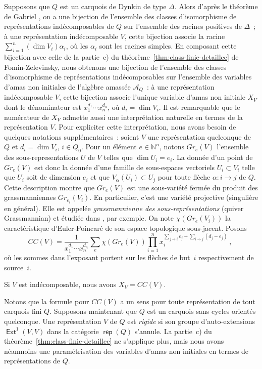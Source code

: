 \documentclass[brochure,12pt]{bourbaki}
\newcommand{\ko}{\: , \;}
\numberwithin{equation}{subsection}
\numberwithin{theorem}{section}
\newcommand{\opname}[1]{\operatorname{\mathsf{#1}}}
\newcommand{\rep}{\opname{rep}\nolimits}
\renewcommand{\rep}{\opname{rep}\nolimits}
\newcommand{\N}{\mathbb{N}}
\newcommand{\Ext}{\opname{Ext}}
\newcommand{\ca}{{\mathcal A}}
\begin{document}
Supposons que $Q$ est un carquois de Dynkin de type $\Delta$. Alors d'apr\`es le
th\'eor\`eme de Gabriel \cite{Gabriel73}, on a une bijection de
l'ensemble des classes d'isomorphisme de repr\'esentations
ind\'ecomposables de $Q$ sur l'ensemble des racines
positives de $\Delta$~; \`a une repr\'esentation ind\'ecomposable
$V$, cette bijection associe la racine
$
\sum_{i=1}^n (\dim V_i) \alpha_i
$,
o\`u les $\alpha_i$ sont les racines simples. En composant cette bijection
avec celle de la partie~c) du th\'eor\`eme~\ref{thm:class-finie-detaillee}
de Fomin-Zelevinsky,
nous obtenons une bijection de l'ensemble des classes
d'isomorphisme de repr\'esentations ind\'ecomposables sur l'ensemble
des variables d'amas non initiales de l'alg\`ebre amass\'ee $\ca_Q$~:
\`a une repr\'esentation ind\'ecomposable $V$, cette bijection associe l'unique
variable d'amas non initiale $X_V$ dont le d\'enominateur est
$x_1^{d_1} \cdots x_n^{d_n}$, o\`u $d_i=\dim V_i$. Il est
remarquable que le num\'erateur de $X_V$ admette aussi une interpr\'etation
naturelle en termes de la repr\'esentation $V$.
Pour expliciter cette interpr\'etation, nous avons besoin
de quelques notations suppl\'ementaires~: soient $V$ une repr\'esentation
quelconque de $Q$ et $d_i=\dim V_i$, $i\in Q_0$.
Pour un \'el\'ement $e\in \N^n$, notons $Gr_e(V)$ l'ensemble
des sous-representations $U$ de $V$ telles que $\dim U_i = e_i$.
La donn\'ee d'un point de $Gr_e(V)$ est donc la donn\'ee d'une
famille de sous-espaces vectoriels $U_i \subset V_i$ telle que $U_i$
soit de dimension $e_i$
et que $V_\alpha(U_i)\subset U_j$ pour toute fl\`eche $\alpha: i\to j$
de $Q$. Cette description montre que $Gr_e(V)$ est une sous-vari\'et\'e
ferm\'ee du produit des grassmanniennes $Gr_{e_i}(V_i)$. En particulier,
c'est une vari\'et\'e projective (singuli\`ere en g\'en\'eral). Elle est appel\'ee
{\em grassmannienne des sous-repr\'esentations} (quiver Grassmannian) et \'etudi\'ee
dans \cite{CalderoReineke08}, par exemple. On note $\chi(Gr_e(V_i))$ la
caract\'eristique d'Euler-Poincar\'e de son espace topologique sous-jacent.
Posons
\[
CC(V)= \frac{1}{x_1^{d_1} \cdots x_n^{d_n}}
\sum_e \chi(Gr_e(V)) \prod_{i=1}^n x_i^{\sum_{j\to i} e_j + \sum_{i\to j} (d_j-e_j)} \ko
\]
o\`u les sommes dans l'exposant portent sur les fl\`eches de but~$i$
respectivement de source~$i$.
\begin{theo} Si $V$ est ind\'ecomposable,
nous avons $X_V = CC(V)$.
\end{theo}

Notons que la formule pour $CC(V)$ a un sens pour toute repr\'esentation
de tout carquois fini $Q$. Supposons maintenant que $Q$ est un carquois
sans cycles orient\'es quelconque. Une repr\'esentation $V$ de $Q$ est
{\em rigide} si son groupe d'auto-extensions $\Ext^1(V,V)$ dans la
cat\'egorie $\rep(Q)$ s'annule. La partie~c) du
th\'eor\`eme~\ref{thm:class-finie-detaillee} ne s'applique plus,
mais nous avons n\'eanmoins une param\'etrisation des variables
d'amas non initiales en termes de repr\'esentations de $Q$.
\end{document}
